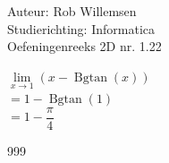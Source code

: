 \documentclass[a4paper]{article}
\newcommand{\Bgtan}{\operatorname{Bgtan}}
\begin{document}
\noindent \large Auteur: Rob Willemsen \\
\noindent \large Studierichting: Informatica\\
\noindent \large Oefeningenreeks 2D nr. 1.22\\

\medskip

\normalsize

$\lim\limits_{x \rightarrow 1} (x - \Bgtan(x)) $ \\ 

$= 1 - \Bgtan(1)$ \\

$= 1 - \dfrac{\pi}{4}$ \\

\begin{thebibliography}{999}
\end{thebibliography}
\end{document}
